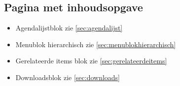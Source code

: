 \subsection{Pagina met inhoudsopgave}
\label{sec:paginametinhoudsopgave}

\begin{itemize}
  \item Agendalijstblok zie \ref{sec:agendalijst}
  \item Menublok hierarchisch zie \ref{sec:menublokhierarchisch}
  \item Gerelateerde items blok zie \ref{sec:gerelateerdeitems}
  \item Downloadsblok zie \ref{sec:downloads}
\end{itemize}
